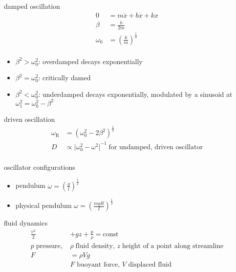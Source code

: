 \documentclass[avery5388, frame]{flashcards}
\begin{document}
\begin{flashcard}{damped oscillation}
  {
    \begin{align*}
      0 &= m\ddot{x} + b\dot{x} + kx \\
      \beta &= \frac{b}{2m}\\
      \omega_{0} &= (\frac{k}{m})^{\frac{1}{2}}\\
    \end{align*}
  }
  {
    \begin{itemize}
    \item $\beta^{2} > \omega_{0}^{2}$: overdamped decays exponentially
    \item $\beta^{2} = \omega_{0}^{2}$: critically damed
    \item $\beta^{2} < \omega_{0}^{2}$: underdamped decays exponentially, modulated by a sinusoid at $\omega_{1}^{2} = \omega_{0}^{2} - \beta^{2}$
    \end{itemize}
  }
\end{flashcard}

\begin{flashcard}{driven oscillation}
  {
    \begin{align*}
      \omega_{\textrm{R}} &= (\omega_{0}^{2} - 2 \beta^{2})^{\frac{1}{2}}\\
      D &\propto {\vert \omega_{0}^{2} - \omega^{2} \vert}^{-1} \; \textrm{for undamped, driven oscillator}\\
    \end{align*}
  }
\end{flashcard}

\begin{flashcard}{oscillator configurations}
  {
    \begin{itemize}
    \item pendulum $\omega = (\frac{g}{l})^{\frac{1}{2}}$
    \item physical pendulum $\omega = (\frac{mgR}{I})^{\frac{1}{2}}$
    \end{itemize}
  }
\end{flashcard}

\begin{flashcard}{fluid dynamics}
  {
    \begin{align*}
      \frac{v^2}{2} &+ g z + \frac{p}{\rho} = \textrm{const}\\
      p \; \textrm{pressure, } &\rho \; \textrm{fluid density, } z \; \textrm{height of a point along streamline}\\
      F & = \rho V g\\
      &\textrm{$F$ buoyant force, $V$ displaced fluid}
    \end{align*}
  }
\end{flashcard}
\end{document}
